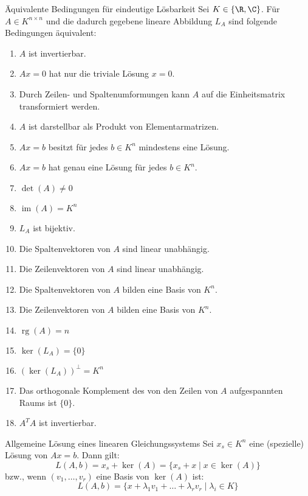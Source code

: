 \documentclass[german]{../spicker}
\newcommand{\im}{\operatorname{im}}
\newcommand{\rg}{\operatorname{rg}}
\begin{document}
\begin{bonus}{Äquivalente Bedingungen für eindeutige Lösbarkeit}
    Sei $K \in \{\R, \C\}$.
    Für $A \in K^{n\times n}$ und die dadurch gegebene lineare Abbildung $L_A$ sind folgende Bedingungen äquivalent:
    \begin{enumerate}
        \item $A$ ist invertierbar.
        \item $Ax = 0$ hat nur die triviale Lösung $x=0$.
        \item Durch Zeilen- und Spaltenumformungen kann $A$ auf die Einheitsmatrix transformiert werden.
        \item $A$ ist darstellbar als Produkt von Elementarmatrizen.
        \item $Ax = b$ besitzt für jedes $b \in K^n$ mindestens eine Lösung.
        \item $Ax = b$ hat genau eine Lösung für jedes $b \in K^n$.
        \item $\det(A) \neq 0$
        \item $\im(A) = K^n$
        \item $L_A$ ist bijektiv.
        \item Die Spaltenvektoren von $A$ sind linear unabhängig.
        \item Die Zeilenvektoren von $A$ sind linear unabhängig.
        \item Die Spaltenvektoren von $A$ bilden eine Basis von $K^n$.
        \item Die Zeilenvektoren von $A$ bilden eine Basis von $K^n$.
        \item $\rg(A)=n$
        \item $\ker(L_A) = \{0\}$
        \item $(\ker(L_A))^\perp = K^n$
        \item Das orthogonale Komplement des von den Zeilen von $A$ aufgespannten Raums ist $\{0\}$.
        \item $A^TA$ ist invertierbar.
    \end{enumerate}
\end{bonus}

\begin{defi}{Allgemeine Lösung eines linearen Gleichungssystems}
    Sei $x_s \in K^n$ eine (spezielle) Lösung von $Ax = b$.
    Dann gilt:
    $$
        L(A, b) = x_s + \ker(A) = \{x_s + x \mid x \in \ker(A)\}
    $$
    bzw., wenn $(v_1, \ldots, v_r)$ eine Basis von $\ker(A)$ ist:
    $$
        L(A, b) = \{x + \lambda_1 v_1 + \ldots + \lambda_rv_r \mid \lambda_i \in K\}
    $$
\end{defi}
\end{document}
